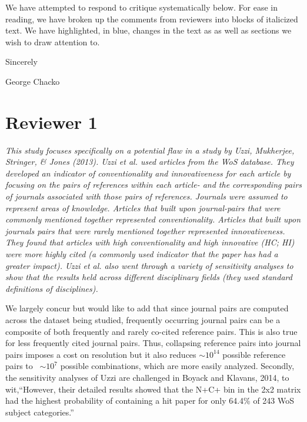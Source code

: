 \documentclass[11pt, oneside]{article}   	%
\begin{document}
We have attempted to respond  to critique systematically below. For ease in reading, we have broken up the comments from reviewers into blocks of italicized text. We have highlighted, in blue, changes in the text as as well as sections we wish to draw attention to.

Sincerely

George Chacko

\section{Reviewer 1}

\emph{This study focuses specifically on a potential flaw in a study by Uzzi, Mukherjee, Stringer, \& Jones  (2013).  Uzzi et al. used articles from the WoS database. They developed an indicator of conventionality and innovativeness for each article by focusing on the pairs of references within each article- and the corresponding pairs of journals associated with those pairs of references. Journals were assumed to represent areas of knowledge. Articles that built upon journal-pairs that were commonly mentioned together represented conventionality.  Articles that built upon journals pairs that were rarely mentioned together represented innovativeness. They found that articles with high conventionality and high innovative (HC; HI) were more highly cited (a commonly used indicator that the paper has had a greater impact). Uzzi et al. also went through a variety of sensitivity analyses to show that the results held across different disciplinary fields (they used standard definitions of disciplines).}   

We largely concur but would like to add that since journal pairs are computed across the dataset being studied, frequently occurring journal pairs can be a composite of both frequently and rarely co-cited reference pairs. This is also true for less frequently cited journal pairs. Thus, collapsing reference pairs into journal pairs imposes a cost on resolution but it also reduces $\sim10^{14}$ possible reference pairs to ~$\sim10^7$ possible combinations, which are more easily analyzed. Secondly, the sensitivity analyses of Uzzi are challenged in Boyack and Klavans, 2014, to wit,``However, their detailed results showed that the N+C+ bin in the 2x2 matrix had the highest probability of containing a hit paper for only 64.4\% of 243 WoS subject categories.'' 
\end{document}
